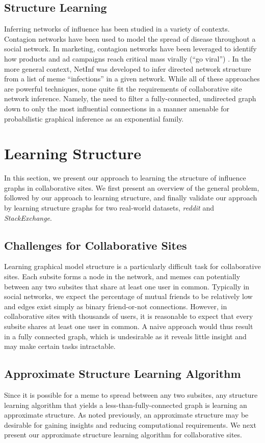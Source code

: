 \documentclass{article} %
\begin{document}
\subsection{Structure Learning}
Inferring networks of influence has been studied in a variety of contexts. Contagion networks have been used \cite{contagion} to model the spread of disease throughout a social network. In marketing, contagion networks have been leveraged to identify how products and ad campaigns reach critical mass virally (``go viral'') \cite{marketing1, marketing2}. In the more general context, NetInf \cite{netinf} was developed to infer directed network structure from a list of meme ``infections'' in a given network. While all of these approaches are powerful techniques, none quite fit the requirements of collaborative site network inference. Namely, the need to filter a fully-connected, undirected graph down to only the most influential connections in a manner amenable for probabilistic graphical inference as an exponential family.

\section{Learning Structure}
\label{sec:structure}
In this section, we present our approach to learning the structure of influence graphs in collaborative sites. We first present an overview of the general problem, followed by our approach to learning structure, and finally validate our approach by learning structure graphs for two real-world datasets, \textit{reddit} and \textit{StackExchange}.

\subsection{Challenges for Collaborative Sites}
Learning graphical model structure is a particularly difficult task for collaborative sites. Each subsite forms a node in the network, and memes can potentially between any two subsites that share at least one user in common. Typically in social networks, we expect the percentage of mutual friends to be relatively low and edges exist simply as binary friend-or-not connections. However, in collaborative sites with thousands of users, it is reasonable to expect that every subsite shares at least one user in common. A naive approach would thus result in a fully connected graph, which is undesirable as it reveals little insight and may make certain tasks intractable.

\subsection{Approximate Structure Learning Algorithm}
Since it is possible for a meme to spread between any two subsites, any structure learning algorithm that yields a less-than-fully-connected graph is learning an approximate structure. As noted previously, an approximate structure may be desirable for gaining insights and reducing computational requirements. We next present our approximate structure learning algorithm for collaborative sites.
\end{document}
